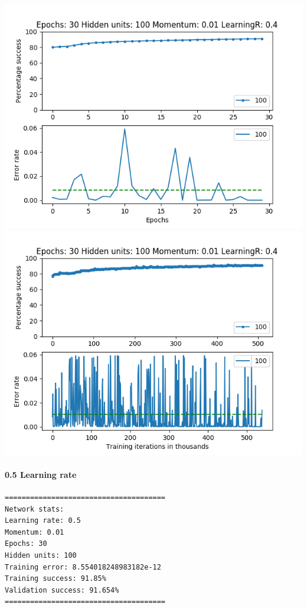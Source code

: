 \documentclass[11pt]{article}
\makeatletter
\def\maxwidth{\ifdim\Gin@nat@width>\linewidth\linewidth
    \else\Gin@nat@width\fi}
\let\Oldincludegraphics\includegraphics
\renewcommand{\includegraphics}[1]{\Oldincludegraphics[width=.8\maxwidth]{#1}}
\makeatother
\begin{document}
\includegraphics{Experiment2/E2_NN_Epoch_Momentum_0.01_30Epochs_100_LR_0.4_Hiddenunits.png}
\includegraphics{Experiment2/E2_NN_Training_Momentum_0.01_30Epochs_100_LR_0.4_Hiddenunits.png}

\hypertarget{learning-rate-5}{%
\paragraph{0.5 Learning rate}\label{learning-rate-5}}

\begin{verbatim}
======================================
Network stats: 
Learning rate: 0.5
Momentum: 0.01
Epochs: 30
Hidden units: 100
Training error: 8.554018248983182e-12
Training success: 91.85%
Validation success: 91.654%
======================================
\end{verbatim}
\end{document}
